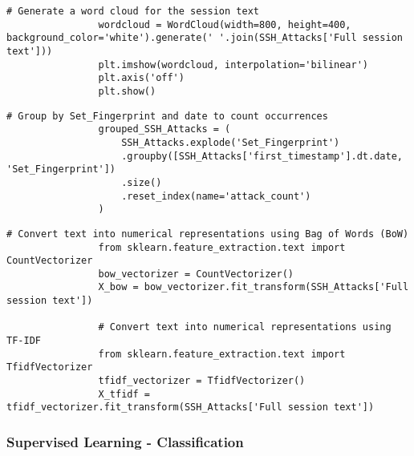             \begin{lstlisting}[caption={Generate a word cloud from session text}, label={lst:generate-wordcloud}]
                # Generate a word cloud for the session text
                wordcloud = WordCloud(width=800, height=400, background_color='white').generate(' '.join(SSH_Attacks['Full session text']))
                plt.imshow(wordcloud, interpolation='bilinear')
                plt.axis('off')
                plt.show()
            \end{lstlisting}

            \begin{lstlisting}[caption={Group attacks by fingerprint and date}, label={lst:group-attacks}]
                # Group by Set_Fingerprint and date to count occurrences
                grouped_SSH_Attacks = (
                    SSH_Attacks.explode('Set_Fingerprint')
                    .groupby([SSH_Attacks['first_timestamp'].dt.date, 'Set_Fingerprint'])
                    .size()
                    .reset_index(name='attack_count')
                )
            \end{lstlisting}

            \begin{lstlisting}[caption={Convert text into numerical representations}, label={lst:convert-text-numerical}]
                # Convert text into numerical representations using Bag of Words (BoW)
                from sklearn.feature_extraction.text import CountVectorizer
                bow_vectorizer = CountVectorizer()
                X_bow = bow_vectorizer.fit_transform(SSH_Attacks['Full session text'])

                # Convert text into numerical representations using TF-IDF
                from sklearn.feature_extraction.text import TfidfVectorizer
                tfidf_vectorizer = TfidfVectorizer()
                X_tfidf = tfidf_vectorizer.fit_transform(SSH_Attacks['Full session text'])
            \end{lstlisting}

        \subsubsection{Supervised Learning - Classification}


